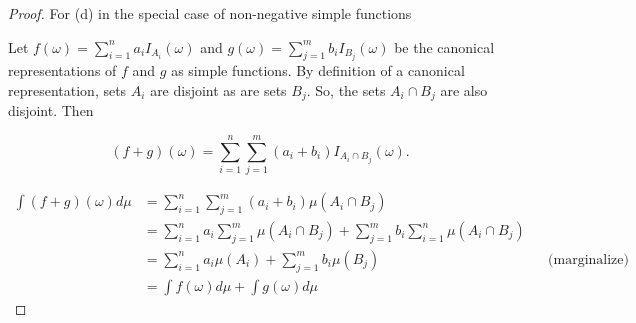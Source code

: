 \documentclass{book}
\theoremstyle{plain}%
\theoremstyle{definition}
\begin{document}
\begin{proof}{For (d) in the special case of non-negative simple functions}

Let $f(\omega) = \sum_{i=1}^n a_i I_{A_i}(\omega)$ and  $g(\omega) = \sum_{j=1}^m b_i I_{B_j}(\omega)$ be the canonical representations of $f$ and $g$ as simple functions. By definition of a canonical representation, sets $A_i$ are disjoint as are sets $B_j$. So, the sets $A_i \cap B_j$ are also disjoint. Then

$$(f + g)(\omega) = \sum_{i=1}^n \sum_{j=1}^m (a_i + b_i) I_{A_i \cap B_j}(\omega).$$

\begin{align*}
\int (f + g)(\omega) d\mu &= \sum_{i=1}^n \sum_{j=1}^m (a_i + b_i) \mu(A_i \cap B_j) \\
&= \sum_{i=1}^n a_i \sum_{j=1}^m  \mu(A_i \cap B_j) + \sum_{j=1}^m b_i \sum_{i=1}^n \mu(A_i \cap B_j)  \\
&= \sum_{i=1}^n a_i
 \mu(A_i) + \sum_{j=1}^m b_i \mu(B_j) && \text{(marginalize)} \\
&= \int f(\omega) d\mu + \int g(\omega) d\mu
\end{align*}
\end{proof}
\end{document}
